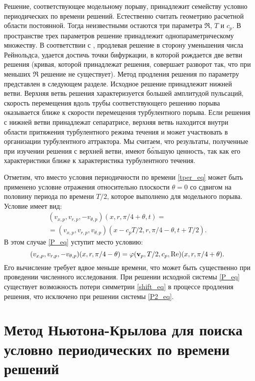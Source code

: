 Решение, соответствующее модельному порыву, принадлежит семейству условно периодических по времени решений. Естественно считать геометрию расчетной области постоянной. Тогда неизвестными остаются три параметра $\Re$, $T$ и $c_p$. В пространстве трех параметров решение принадлежит однопараметрическому множеству. В соответствии с \cite{Avila2013}, продлевая решение в сторону уменьшения числа Рейнольдса, удается достичь точки бифуркации, в которой рождается две ветви решения (кривая, которой принадлежат решения, совершает разворот так, что при меньших $\Re$ решение не существует). Метод продления решения по параметру представлен в следующем разделе. Исходное решение принадлежит нижней ветви. Верхняя ветвь решения характеризуется большей амплитудой пульсаций, скорость перемещения вдоль трубы соответствующего решению порыва оказывается ближе к скорости перемещения турбулентного порыва. Если решения с нижней ветви принадлежат сепаратрисе, верхняя ветвь находится внутри области притяжения турбулентного режима течения и может участвовать в организации турбулентного аттрактора. Мы считаем, что результаты, полученные при изучении решения с верхней ветви, имеют б\'{о}льшую ценность, так как его характеристики ближе к характеристика турбулентного течения. 

Отметим, что вместо условия периодичности по времени \eqref{tper_eq} может быть применено условие отражения относительно плоскости $\theta = 0$ со сдвигом на половину периода по времени $T/2$, которое выполнено для модельного порыва. Условие имеет вид:
\begin{multline}\label{shift_eq}
(v_{x,p}, v_{r,p}, - v_{\theta,p})(x,r,\pi/4 + \theta,t) = \\ =(v_{x,p}, v_{r,p}, v_{\theta,p})(x - c_p T/2,r,\pi/4 - \theta,t+T/2).
\end{multline}
В этом случае \eqref{P_eq} уступит место условию:
\begin{equation}\label{P2_eq}
(v_{x,p}, v_{r,p}, - v_{\theta,p})(x,r,\pi/4 - \theta) = \varphi(\mathbf{v}_p, T/2, c_p, \operatorname{Re})(x,r,\pi/4 + \theta).
\end{equation}
Его вычисление требует вдвое меньше времени, что может быть существенно при проведении численного исследования. При решении исходной системы \eqref{P_eq} существует возможность потери симметрии \eqref{shift_eq} в процессе продления решения, что исключено при решении системы \eqref{P2_eq}.


\section{Метод Ньютона-Крылова для поиска условно периодических по времени решений} \label{Newton_seq}

